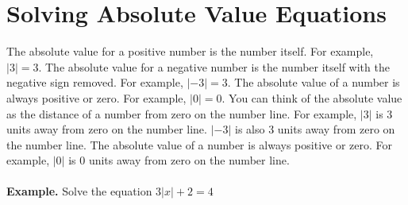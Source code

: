 \section{Solving Absolute Value Equations}

The absolute value for a positive number is the number itself. For example, $|3|=3$. The absolute value for a negative number is the number itself with the negative sign removed. For example, $|-3|=3$. The absolute value of a number is always positive or zero. For example, $|0|=0$.
You can think of the absolute value as the distance of a number from zero on the number line. For example, $|3|$ is 3 units away from zero on the number line. $|-3|$ is also 3 units away from zero on the number line. The absolute value of a number is always positive or zero. For example, $|0|$ is 0 units away from zero on the number line.
\\\\
\textbf{Example.} Solve the equation $3|x|+2=4$


